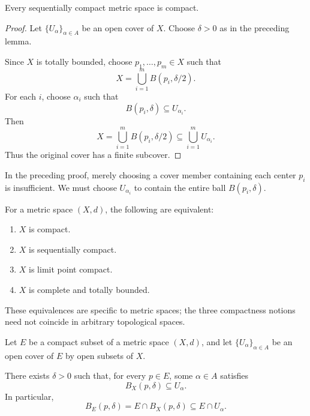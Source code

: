 \documentclass[answers,12pt,addpoints]{exam}
\begin{document}
\begin{theorem}
Every sequentially compact metric space is compact.
\end{theorem}

\begin{proof}
Let $\{U_\alpha\}_{\alpha\in A}$ be an open cover of $X$.
Choose $\delta>0$ as in the preceding lemma.

Since $X$ is totally bounded, choose
$p_1,\ldots,p_m\in X$ such that
\[
X=\bigcup_{i=1}^{m}B(p_i,\delta/2).
\]
For each $i$, choose $\alpha_i$ such that
\[
B(p_i,\delta)\subseteq U_{\alpha_i}.
\]
Then
\[
X
=\bigcup_{i=1}^{m}B(p_i,\delta/2)
\subseteq\bigcup_{i=1}^{m}U_{\alpha_i}.
\]
Thus the original cover has a finite subcover.
\end{proof}

\begin{remark}
In the preceding proof, merely choosing a cover member
containing each center $p_i$ is insufficient.
We must choose $U_{\alpha_i}$ to contain the entire ball
$B(p_i,\delta)$.
\end{remark}

\begin{theorem}
For a metric space $(X,d)$, the following are equivalent:
\begin{enumerate}
    \item $X$ is compact.
    \item $X$ is sequentially compact.
    \item $X$ is limit point compact.
    \item $X$ is complete and totally bounded.
\end{enumerate}
These equivalences are specific to metric spaces;
the three compactness notions need not coincide in
arbitrary topological spaces.
\end{theorem}

\begin{lemma}
Let $E$ be a compact subset of a metric space $(X,d)$,
and let $\{U_\alpha\}_{\alpha\in A}$ be an open cover of
$E$ by open subsets of $X$.

There exists $\delta>0$ such that, for every $p\in E$,
some $\alpha\in A$ satisfies
\[
B_X(p,\delta)\subseteq U_\alpha.
\]
In particular,
\[
B_E(p,\delta)
=
E\cap B_X(p,\delta)
\subseteq E\cap U_\alpha.
\]
\end{lemma}
\end{document}

